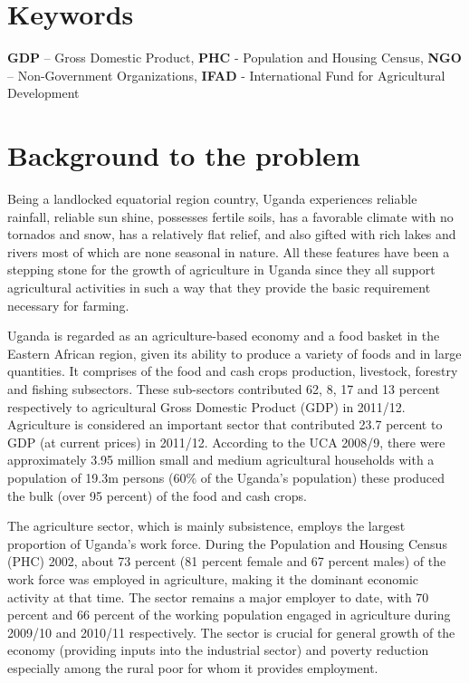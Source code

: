 \documentclass{article}
\begin{document}
\section{Keywords}\label{sec:keywords}
{\bfseries GDP} – Gross Domestic Product, {\bfseries PHC} - Population and Housing Census, {\bfseries  NGO} – Non-Government Organizations, {\bfseries  IFAD} - International Fund for Agricultural Development

\section{Background to the problem}\label{sec:background}
Being a landlocked equatorial region country, Uganda experiences reliable rainfall, reliable sun shine, possesses fertile soils, has a favorable climate with no tornados and snow, has a relatively flat relief, and also gifted with rich lakes and rivers most of which are none seasonal in nature. All these features have been a stepping stone for the growth of agriculture in Uganda since they all support agricultural activities in such a way that they provide the basic requirement necessary for farming.

Uganda is regarded as an agriculture-based economy and a food basket in the Eastern 
African region, given its ability to produce a variety of foods and in large quantities.    It 
comprises of the food and cash crops production,  livestock,  forestry  and  fishing  subsectors.    These  sub-sectors  contributed  62,  8,  17  and  13  percent  respectively  to 
agricultural  Gross  Domestic  Product  (GDP)  in  2011/12.    Agriculture  is  considered  an 
important  sector  that  contributed  23.7  percent  to  GDP  (at  current  prices)  in  2011/12. 
According to the  UCA  2008/9, there were approximately 3.95 million small and medium 
agricultural  households  with  a  population  of  19.3m  persons  (60\%  of  the  Uganda’s 
population) these produced the bulk (over 95 percent) of the food and cash crops.

The  agriculture  sector,  which  is  mainly  subsistence,  employs  the  largest  proportion  of 
Uganda’s work force. During the  Population and Housing Census (PHC)  2002,  about  73 
percent  (81  percent  female  and  67  percent  males)  of  the  work  force  was  employed  in 
agriculture,  making it the dominant  economic activity at that time.    The sector  remains  a
major  employer  to  date,  with  70  percent  and  66  percent  of  the  working  population 
engaged in agriculture during 2009/10 and 2010/11 respectively.  The sector is crucial for 
general  growth  of the  economy  (providing  inputs  into  the  industrial  sector)  and  poverty 
reduction especially among the rural poor for whom it provides employment.
\end{document}
